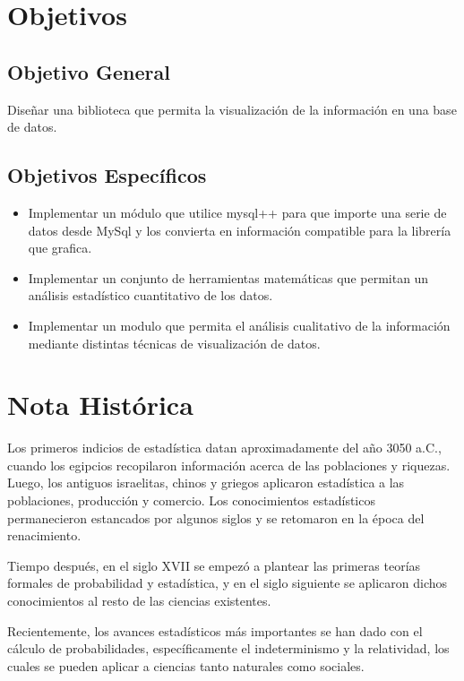 \documentclass[a4paper]{article}
\begin{document}
\section{Objetivos}

\subsection{Objetivo General}
Diseñar una biblioteca que permita la visualización de la información en una base de datos.

\subsection{Objetivos Específicos}

\begin{itemize}
\item Implementar un módulo que utilice mysql++ para que importe una serie de datos desde MySql 
      y los convierta en información compatible para la librería que grafica.
\item Implementar un conjunto de herramientas matemáticas que permitan un análisis
	  estadístico cuantitativo de los datos.
\item Implementar un modulo que permita el análisis cualitativo de la información mediante 
	  distintas técnicas de visualización de datos.
\end{itemize}

\section{Nota Histórica}

Los primeros indicios de estadística datan aproximadamente del año 3050 a.C., cuando los egipcios recopilaron información acerca de las poblaciones y riquezas. Luego, los antiguos israelitas, chinos y griegos aplicaron estadística a las poblaciones, producción y comercio.
Los conocimientos estadísticos permanecieron estancados por algunos siglos y se retomaron en la época del renacimiento.

Tiempo después, en el siglo XVII se empezó a plantear las primeras teorías formales de probabilidad y estadística, y en el siglo siguiente se aplicaron dichos conocimientos al resto de las ciencias existentes.

Recientemente, los avances estadísticos más importantes se han dado con el cálculo de probabilidades, específicamente el indeterminismo y la relatividad, los cuales se pueden aplicar a ciencias tanto naturales como sociales.  
\end{document}
